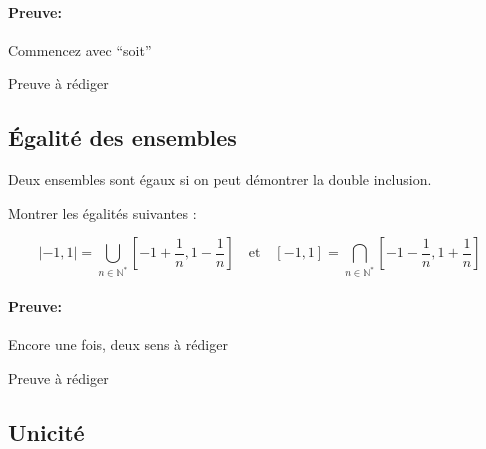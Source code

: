 \documentclass{article}
\begin{document}
\paragraph{Preuve:} Commencez avec ``soit''

\noindent Preuve à rédiger
















\subsection{Égalité des ensembles}

\begin{tcolorbox}[colback=green!5!white,colframe=green!75!black,title=Point méthode 4.6]

Deux ensembles sont égaux si on peut démontrer la double inclusion.

\end{tcolorbox}


\begin{tcolorbox}[colback=cyan!5!white,colframe=cyan!75!black,title=Exercice]

Montrer les égalités suivantes :

\[
| -1, 1 | = \bigcup_{n \in \mathbb{N}^*} \left[ -1 + \frac{1}{n}, 1 - \frac{1}{n} \right] \quad \text{et} \quad [-1, 1] = \bigcap_{n \in \mathbb{N}^*} \left[ -1 - \frac{1}{n}, 1 + \frac{1}{n} \right]
\]

\end{tcolorbox}

\paragraph{Preuve:} Encore une fois, deux sens à rédiger

\noindent Preuve à rédiger
















\subsection{Unicité}
\end{document}
